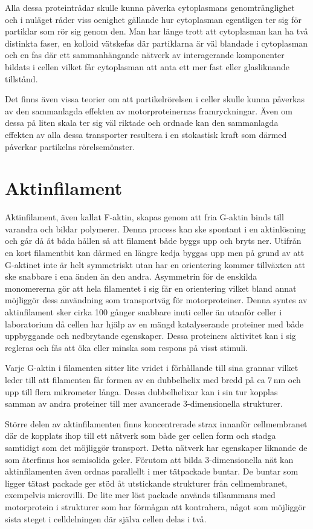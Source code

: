 Alla dessa proteintrådar skulle kunna påverka cytoplasmans genomtränglighet och i nuläget råder viss oenighet gällande hur cytoplasman egentligen ter sig för partiklar som rör sig genom den. Man har länge trott att cytoplasman kan ha två distinkta faser, en kolloid vätskefas där partiklarna är väl blandade i cytoplasman och en fas där ett sammanhängande nätverk av interagerande komponenter bildats i cellen vilket får cytoplasman att anta ett mer fast eller glasliknande tillstånd.

Det finns även vissa teorier om att partikelrörelsen i celler skulle kunna påverkas av den sammanlagda effekten av motorproteinernas framryckningar. Även om dessa på liten skala ter sig väl riktade och ordnade kan den sammanlagda effekten av alla dessa transporter resultera i en stokastisk kraft som därmed påverkar partikelns rörelsemönster. 



\section{Aktinfilament}

Aktinfilament, även kallat F-aktin, skapas genom att fria G-aktin binds till varandra och bildar polymerer. Denna process kan ske spontant i en aktinlösning och går då åt båda hållen så att filament både byggs upp och bryts ner. Utifrån en kort filamentbit kan därmed en längre kedja byggas upp men på grund av att G-aktinet inte är helt symmetriskt utan har en orientering kommer tillväxten att ske snabbare i ena änden än den andra. Asymmetrin för de enskilda monomererna gör att hela filamentet i sig får en orientering vilket bland annat möjliggör dess användning som transportväg för motorproteiner. Denna syntes av aktinfilament sker cirka 100 gånger snabbare inuti celler än utanför celler i laboratorium då cellen har hjälp av en mängd  katalyserande proteiner med både uppbyggande och nedbrytande egenskaper. Dessa proteiners aktivitet kan i sig regleras och fås att öka eller minska som respons på visst stimuli.

Varje G-aktin i filamenten sitter lite vridet i förhållande till sina grannar vilket leder till att filamenten får formen av en dubbelhelix med bredd på ca 7\,nm och upp till flera mikrometer långa. Dessa dubbelhelixar kan i sin tur kopplas samman av andra proteiner till mer avancerade 3-dimensionella strukturer.

Större delen av aktinfilamenten finns koncentrerade strax innanför cellmembranet där de kopplats ihop till ett nätverk som både ger cellen form och stadga samtidigt som det möjliggör transport. Detta nätverk har egenskaper liknande de som återfinns hos semisolida geler. Förutom att bilda 3-dimensionella nät kan aktinfilamenten även ordnas parallellt i mer tätpackade buntar. De buntar som ligger tätast packade ger stöd åt utstickande strukturer från cellmembranet, exempelvis microvilli. De lite mer löst packade används tillsammans med motorprotein i strukturer som har förmågan att kontrahera, något som möjliggör sista steget i celldelningen där själva cellen delas i två. 

